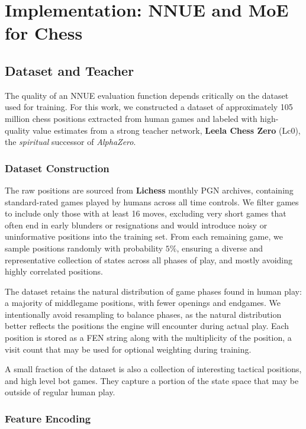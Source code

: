\chapter[Implementation]{Implementation: NNUE and MoE for Chess}\label{ch:implementation}

\section{Dataset and Teacher}\label{sec:dataset}

The quality of an NNUE evaluation function depends critically on the dataset used for training. For this work, we constructed a dataset of approximately 105 million chess positions extracted from human games and labeled with high-quality value estimates from a strong teacher network, \textbf{Leela Chess Zero} (Lc0), the \emph{spiritual} successor of \emph{AlphaZero}.

\subsection{Dataset Construction}\label{sec:dataset-construction}

The raw positions are sourced from \textbf{Lichess} monthly PGN archives, containing standard-rated games played by humans across all time controls. We filter games to include only those with at least 16 moves, excluding very short games that often end in early blunders or resignations and would introduce noisy or uninformative positions into the training set. From each remaining game, we sample positions randomly with probability \(5\%\), ensuring a diverse and representative collection of states across all phases of play, and mostly avoiding highly correlated positions.

The dataset retains the natural distribution of game phases found in human play: a majority of middlegame positions, with fewer openings and endgames. We intentionally avoid resampling to balance phases, as the natural distribution better reflects the positions the engine will encounter during actual play. Each position is stored as a FEN string along with the multiplicity of the position, a visit count that may be used for optional weighting during training.

A small fraction of the dataset is also a collection of interesting tactical positions, and high level bot games. They capture a portion of the state space that may be outside of regular human play.

\subsection{Feature Encoding}\label{sec:feature-encoding}

